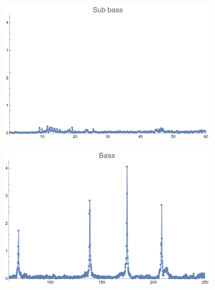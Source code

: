 \documentclass[12pt, letterpaper]{article}
\begin{document}
\begin{figure}[H]
  \centering
  \begin{minipage}{.5\textwidth}
    \centering
    \includegraphics[width=.9\linewidth]{imgs/Cancion10/subbass.png}
    \label{fig:10b}
  \end{minipage}%
  \begin{minipage}{.5\textwidth}
    \centering
    \includegraphics[width=.9\linewidth]{imgs/Cancion10/bass.png}
    \label{fig:10c}
  \end{minipage}
\end{figure}
\end{document}
